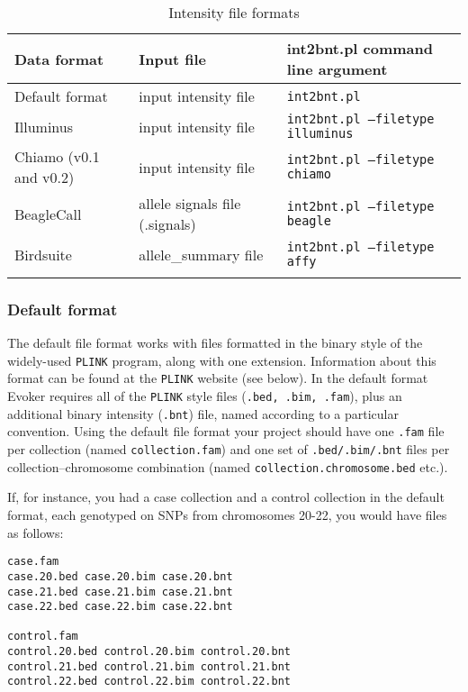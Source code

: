 \documentclass{article}
\begin{document}
\begin{table}
  \begin{center}
    \caption[Intensity file formats]{Intensity file formats}
    \vspace{0.2cm}
    \label{FileFormats}
    \begin{tabular}[p]{ l l l}
     \toprule[1.5pt]
      Data format & Input file & int2bnt.pl command line argument \\
      \midrule
		Default format & input intensity file & \texttt{int2bnt.pl}\\
		Illuminus & input intensity file & \texttt{int2bnt.pl --filetype illuminus}\\
		Chiamo (v0.1 and v0.2) & input intensity file & \texttt{int2bnt.pl --filetype chiamo}\\
		BeagleCall & allele signals file (.signals) & \texttt{int2bnt.pl --filetype beagle}\\
		Birdsuite & allele\_summary file & \texttt{int2bnt.pl --filetype affy}\\
      \addlinespace      
      \bottomrule[0.5pt]
    \end{tabular}
  \end{center}
\end{table}


\subsubsection{Default format}
The default file format works with files formatted in the binary style of the widely-used \texttt{PLINK} program, along with one extension. Information about this format can be found at the \texttt{PLINK} website (see below). In the default format Evoker requires all of the \texttt{PLINK} style files (\texttt{.bed, .bim, .fam}), plus an additional binary intensity (\texttt{.bnt}) file, named according to a particular convention. Using the default file format your project should have one \texttt{.fam} file per collection (named \texttt{collection.fam}) and one set of \texttt{.bed/.bim/.bnt} files per collection--chromosome combination (named \texttt{collection.chromosome.bed} etc.).

If, for instance, you had a case collection and a control collection in the default format, each genotyped on SNPs from chromosomes 20-22, you would have files as follows:

\begin{verbatim}
case.fam
case.20.bed case.20.bim case.20.bnt 
case.21.bed case.21.bim case.21.bnt 
case.22.bed case.22.bim case.22.bnt 

control.fam
control.20.bed control.20.bim control.20.bnt
control.21.bed control.21.bim control.21.bnt
control.22.bed control.22.bim control.22.bnt
\end{verbatim}
\end{document}
